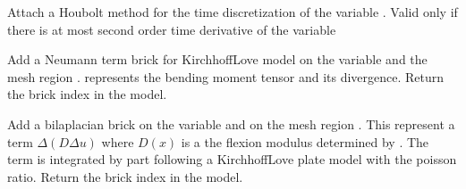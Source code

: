 \documentclass[a4paper,11pt,english]{sphinxmanual}
\begin{document}
\begin{fulllineitems}
\begin{fulllineitems}
\end{fulllineitems}


\begin{fulllineitems}
\label{\detokenize{python/cmdref_Model:getfem.Model.add_Houbolt_scheme}}
Attach a Houbolt method for the time discretization of the variable
. Valid only if there is at most second order time derivative
of the variable

\end{fulllineitems}


\begin{fulllineitems}
\label{\detokenize{python/cmdref_Model:getfem.Model.add_Kirchhoff_Love_Neumann_term_brick}}
Add a Neumann term brick for Kirchhoff\sphinxhyphen{}Love model
on the variable  and the mesh region .
 represents the bending moment tensor and  
its divergence.
Return the brick index in the model.

\end{fulllineitems}


\begin{fulllineitems}
\label{\detokenize{python/cmdref_Model:getfem.Model.add_Kirchhoff_Love_plate_brick}}
Add a bilaplacian brick on the variable
 and on the mesh region .
This represent a term \(\Delta(D \Delta u)\) where \(D(x)\)
is a the flexion modulus determined by . The term is
integrated by part following a Kirchhoff\sphinxhyphen{}Love plate model
with  the poisson ratio.
Return the brick index in the model.


\end{fulllineitems}
\end{fulllineitems}
\end{document}
